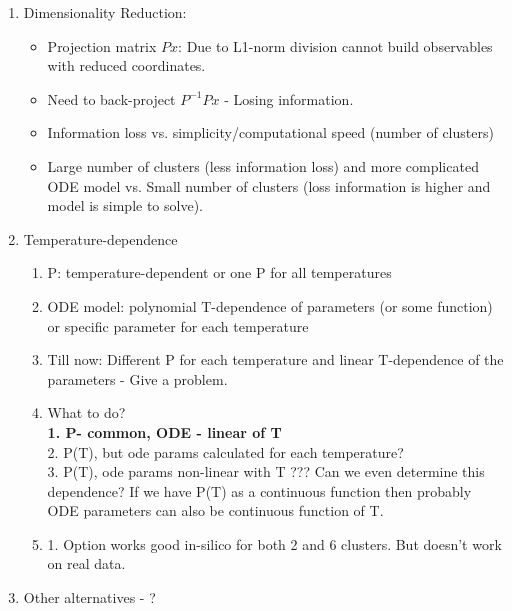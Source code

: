 \documentclass[10pt,A4paper]{article}
\begin{document}
\begin{enumerate}
    \item Dimensionality Reduction:
    \begin{itemize}
        \item Projection matrix $Px$: Due to L1-norm division cannot build observables with reduced coordinates.
        \item Need to back-project $P^{-1} P x$ - Losing information.
        \item Information loss vs. simplicity/computational speed (number of clusters)
        \item Large number of clusters (less information loss) and more complicated ODE model vs. Small number of clusters (loss information is higher and model is simple to solve).
    \end{itemize}
    \item Temperature-dependence
    \begin{enumerate}
        \item P: temperature-dependent or one P for all temperatures
        \item ODE model: polynomial T-dependence of parameters (or some function) or specific parameter for each temperature
        \item Till now: Different P for each temperature and linear T-dependence of the parameters - Give a problem.
        \item What to do?\\
        \textbf{1. P- common, ODE - linear of T}\\
                2. P(T), but ode params calculated for each temperature?\\
                3. P(T), ode params non-linear with  T ???  Can we even determine this dependence?
                If we have P(T) as a continuous function then probably ODE parameters can also be continuous function of T.
        \item 1. Option works good in-silico for both 2 and 6 clusters. But doesn't work on real data.
    \end{enumerate}
    \item Other alternatives - ?
\end{enumerate}
\end{document}
